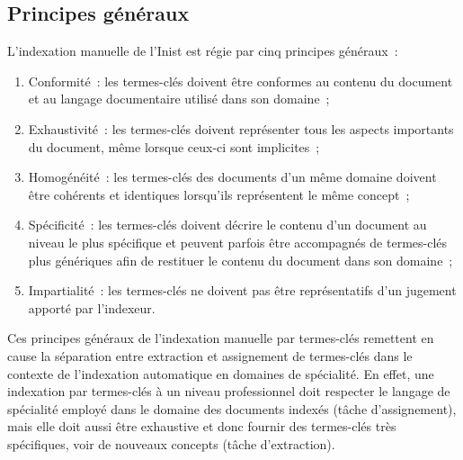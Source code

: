    \subsection{Principes généraux}
    \label{subsec:main-domain_specific_keyphrase_annotation-manual_keyphrase_annotation-principles}
      L'indexation manuelle de l'Inist est régie par cinq principes généraux~:
      \begin{enumerate}
        \item{Conformité~: les termes-clés doivent être conformes au contenu du
              document et au langage documentaire utilisé dans son domaine~;}
        \item{Exhaustivité~: les termes-clés doivent représenter tous les
              aspects importants du document, même lorsque ceux-ci sont
              implicites~;}
        \item{Homogénéité~: les termes-clés des documents d'un même domaine
              doivent être cohérents et identiques lorsqu'ils représentent le
              même concept~;}
        \item{Spécificité~: les termes-clés doivent décrire le contenu d'un
              document au niveau le plus spécifique et peuvent
              parfois être accompagnés de termes-clés plus génériques afin de
              restituer le contenu du document dans son domaine~;}
        \item{Impartialité~: les termes-clés ne doivent pas être représentatifs
              d'un jugement apporté par l'indexeur.}
      \end{enumerate}

      Ces principes généraux de l'indexation manuelle par termes-clés remettent
      en cause la séparation entre extraction et assignement de termes-clés dans
      le contexte de l'indexation automatique en domaines de spécialité. En
      effet, une indexation par termes-clés à un niveau professionnel doit
      respecter le langage de spécialité employé dans le domaine des documents
      indexés (tâche d'assignement), mais elle doit aussi être exhaustive et
      donc fournir des termes-clés très spécifiques, voir de nouveaux concepts
      (tâche d'extraction).

